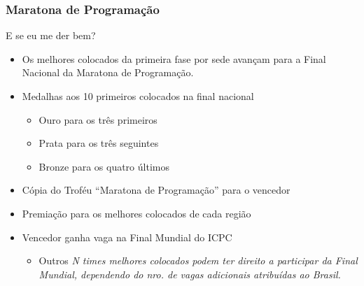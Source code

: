 \begin{frame}
\frametitle{Maratona de Programação}
\begin{block}{E se eu me der bem?}
\begin{itemize}
	\item Os melhores colocados da primeira fase por sede avançam para a Final Nacional da Maratona de Programação.
	\item Medalhas aos 10 primeiros colocados na final nacional
	\begin{itemize}
		\item Ouro para os três primeiros
		\item Prata para os três seguintes
		\item Bronze para os quatro últimos
	\end{itemize}
	\item Cópia do Troféu ``Maratona de Programação'' para o vencedor
	\item Premiação para os melhores colocados de cada região
	\item Vencedor ganha vaga na Final Mundial do ICPC
	\begin{itemize}
		\item Outros \em{N} times melhores colocados podem ter direito a participar da Final Mundial, dependendo do nro. de vagas adicionais atribuídas ao Brasil.
	\end{itemize}
\end{itemize}
\end{block}
\end{frame}

